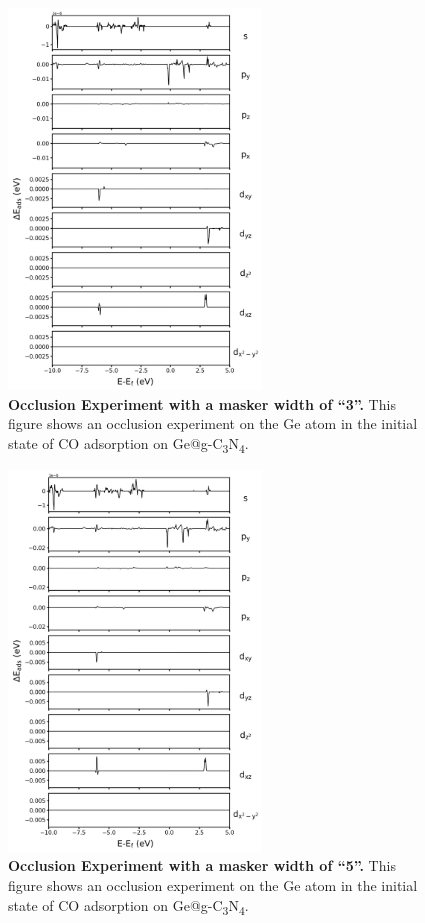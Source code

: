 \documentclass[a4paper, 12pt]{article}
\begin{document}
\begin{figure}[htbp]
  \centering
  \includegraphics[width=0.6\textwidth]{supp_fig23_occl_wid3.png}
  \caption{\textbf{Occlusion Experiment with a masker width of ``3''.}
  This figure shows an occlusion experiment on the Ge atom in
  the initial state of CO adsorption on Ge@g-C\textsubscript{3}N\textsubscript{4}.}
  \label{supp_fig23:occl_wid3}
\end{figure}

\begin{figure}[htbp]
  \centering
  \includegraphics[width=0.6\textwidth]{supp_fig24_occl_wid5.png}
  \caption{\textbf{Occlusion Experiment with a masker width of ``5''.}
  This figure shows an occlusion experiment on the Ge atom in
  the initial state of CO adsorption on Ge@g-C\textsubscript{3}N\textsubscript{4}.}
  \label{supp_fig24:occl_wid5}
\end{figure}
\end{document}
